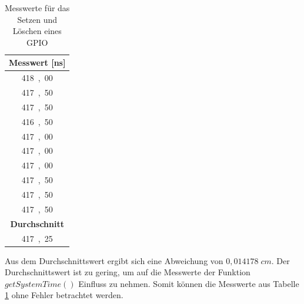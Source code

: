 \begin{table}[H]
\centering
\caption{Messwerte für das Setzen und Löschen eines GPIO}
\label{table:modul_E2}
\begin{tabular}{|c|}
\hline
\textbf{Messwert [\si{ns}]} \\ \hline
\si{418,00} \\ \hline
\si{417,50} \\ \hline
\si{417,50} \\ \hline
\si{416,50} \\ \hline
\si{417,00} \\ \hline
\si{417,00} \\ \hline
\si{417,00} \\ \hline
\si{417,50} \\ \hline
\si{417,50} \\ \hline
\si{417,50} \\ \hline
\textbf{Durchschnitt} \\ \hline
\si{417,25} \\ \hline
\end{tabular}
\end{table}

Aus dem Durchschnittswert ergibt sich eine Abweichung von $0,014178 \; cm$. Der Durchschnittswert ist zu gering, um auf die Messwerte der Funktion $getSystemTime()$ Einfluss zu nehmen. Somit können die Messwerte aus Tabelle \ref{table:modul_E2} ohne Fehler betrachtet werden.


